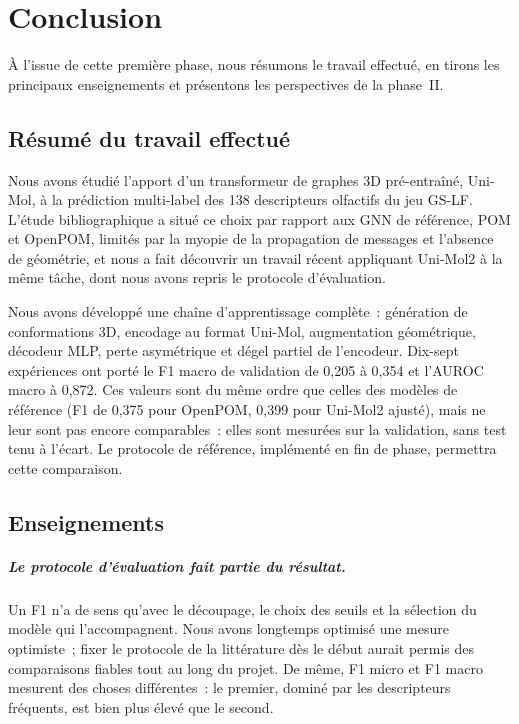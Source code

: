 \chapter{Conclusion}
\label{chap:Conclusion}

À l'issue de cette première phase, nous résumons le travail effectué, en tirons les principaux enseignements et présentons les perspectives de la phase~II.


\section{Résumé du travail effectué}
\label{sec:Resume}

Nous avons étudié l'apport d'un transformeur de graphes 3D pré-entraîné, Uni-Mol, à la prédiction multi-label des 138 descripteurs olfactifs du jeu GS-LF.
L'étude bibliographique a situé ce choix par rapport aux GNN de référence, POM et OpenPOM, limités par la myopie de la propagation de messages et l'absence de géométrie, et nous a fait découvrir un travail récent appliquant Uni-Mol2 à la même tâche, dont nous avons repris le protocole d'évaluation.

Nous avons développé une chaîne d'apprentissage complète~: génération de conformations 3D, encodage au format Uni-Mol, augmentation géométrique, décodeur MLP, perte asymétrique et dégel partiel de l'encodeur.
Dix-sept expériences ont porté le F1 macro de validation de 0,205 à 0,354 et l'AUROC macro à 0,872.
Ces valeurs sont du même ordre que celles des modèles de référence (F1 de 0,375 pour OpenPOM, 0,399 pour Uni-Mol2 ajusté), mais ne leur sont pas encore comparables~: elles sont mesurées sur la validation, sans test tenu à l'écart.
Le protocole de référence, implémenté en fin de phase, permettra cette comparaison.


\section{Enseignements}
\label{sec:Enseignements}

\paragraph{Le protocole d'évaluation fait partie du résultat.}
Un F1 n'a de sens qu'avec le découpage, le choix des seuils et la sélection du modèle qui l'accompagnent.
Nous avons longtemps optimisé une mesure optimiste~; fixer le protocole de la littérature dès le début aurait permis des comparaisons fiables tout au long du projet.
De même, F1 micro et F1 macro mesurent des choses différentes~: le premier, dominé par les descripteurs fréquents, est bien plus élevé que le second.

